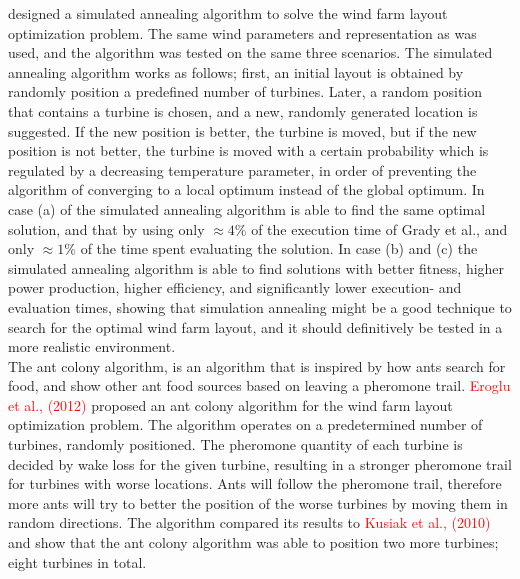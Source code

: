 \noindent \cite{Bilbao} designed a simulated annealing algorithm to solve the wind farm layout optimization problem. The same wind parameters and representation as \cite{Grady} was used, and the algorithm was tested on the same three scenarios. The simulated annealing algorithm works as follows; first, an initial layout is obtained by randomly position a predefined number of turbines. Later, a random position that contains a turbine is chosen, and a new, randomly generated location is suggested. If the new position is better, the turbine is moved, but if the new position is not better, the turbine is moved with a certain probability which is regulated by a decreasing temperature parameter, in order of preventing the algorithm of converging to a local optimum instead of the global optimum. In case (a) of \citep{Grady} the simulated annealing algorithm is able to find the same optimal solution, and that by using only $\approx 4\%$ of the execution time of Grady et al., and only $\approx 1\%$ of the time spent evaluating the solution. In case (b) and (c) the simulated annealing algorithm is able to find solutions with better fitness, higher power production, higher efficiency, and significantly lower execution- and evaluation times, showing that simulation annealing might be a good technique to search for the optimal wind farm layout, and it should definitively be tested in a more realistic environment. \\ 


\noindent The ant colony algorithm, is an algorithm that is inspired by how ants search for food, and show other ant food sources based on leaving a pheromone trail. \textcolor{red}{Eroglu et al., (2012)} proposed an ant colony algorithm for the wind farm layout optimization problem. The algorithm operates on a predetermined number of turbines, randomly positioned. The pheromone quantity of each turbine is decided by wake loss for the given turbine, resulting in a stronger pheromone trail for turbines with worse locations. Ants will follow the pheromone trail, therefore more ants will try to better the position of the worse turbines by moving them in random directions. The algorithm compared its results to \textcolor{red}{Kusiak et al., (2010)} and show that the ant colony algorithm was able to position two more turbines; eight turbines in total. \\


